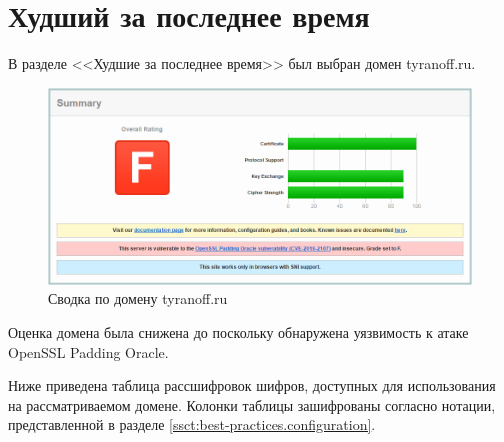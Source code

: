 \section{Худший за последнее время}

В разделе <<Худшие за последнее время>> был выбран домен tyranoff.ru. 

\begin{figure}[H]
    \centering
    \includegraphics[width=\textwidth]{resources/02_summary.png}
    \caption{Сводка по домену tyranoff.ru}
    \label{fig:02-summary}
\end{figure}

Оценка домена была снижена до  поскольку обнаружена уязвимость к атаке OpenSSL Padding Oracle.

Ниже приведена таблица рассшифровок шифров, доступных для использования на рассматриваемом домене. Колонки таблицы зашифрованы 
согласно нотации, представленной в разделе \ref{ssct:best-practices.configuration}.

